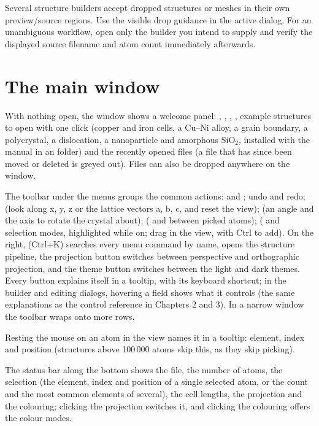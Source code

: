 Several structure builders accept dropped structures or meshes in their own preview/source regions. Use the visible drop guidance in the active dialog. For an unambiguous workflow, open only the builder you intend to supply and verify the displayed source filename and atom count immediately afterwards.

\section{The main window}
With nothing open, the window shows a welcome panel: , , , , example structures to open with one click (copper and iron cells, a Cu--Ni alloy, a grain boundary, a polycrystal, a dislocation, a nanoparticle and amorphous SiO$_2$, installed with the manual in an  folder) and the recently opened files (a file that has since been moved or deleted is greyed out). Files can also be dropped anywhere on the window.

The toolbar under the menus groups the common actions:  and ; undo and redo;  (look along x, y, z or the lattice vectors a, b, c, and reset the view);  (an angle and the axis to rotate the crystal about);  ( and  between picked atoms);  ( and  selection modes, highlighted while on; drag in the view, with Ctrl to add). On the right,  (Ctrl+K) searches every menu command by name,  opens the structure pipeline, the projection button switches between perspective and orthographic projection, and the theme button switches between the light and dark themes. Every button explains itself in a tooltip, with its keyboard shortcut; in the builder and editing dialogs, hovering a field shows what it controls (the same explanations as the control reference in Chapters 2 and 3). In a narrow window the toolbar wraps onto more rows.

Resting the mouse on an atom in the view names it in a tooltip: element, index and position (structures above 100\,000 atoms skip this, as they skip picking).

The status bar along the bottom shows the file, the number of atoms, the selection (the element, index and position of a single selected atom, or the count and the most common elements of several), the cell lengths, the projection and the colouring; clicking the projection switches it, and clicking the colouring offers the colour modes.

